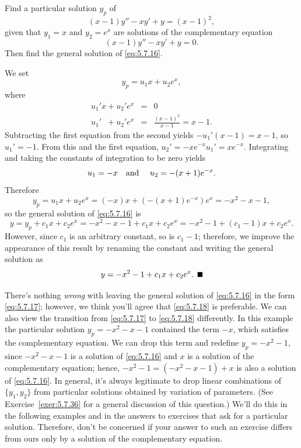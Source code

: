 \begin{example}
  \label{example:5.7.2} \rm Find a particular solution $y_{p}$ of
  \begin{equation}
    \label{eq:5.7.16}(x-1)y''-xy'+y=(x-1)^{2},
  \end{equation}
  given that $y_{1}=x$ and $y_{2}=e^{x}$ are solutions of the complementary equation
  \[
    (x-1)y''-xy'+y=0.
  \]
  Then find the general solution of \eqref{eq:5.7.16}.
\end{example}

\begin{examplesolution}
\solution We set
\[
  y_{p}=u_{1}x+u_{2}e^{x},
\]
where
\begin{eqnarray*}
  u_{1}'x+u_{2}'e^{x}           & = & 0 \\
  u_{1}'\phantom{x}+u_{2}'e^{x} & = & \frac{(x-1)^{2}}{x-1}=x-1.
\end{eqnarray*}
Subtracting the first equation from the second yields $-u_{1}'(x-1)=x-1$, so $u_{1}'=-1$. From this
and the first equation, $u_{2}'=-xe^{-x}u_{1}'=xe^{-x}$. Integrating and taking the constants of
integration to be zero yields
\[
  u_{1}=-x\mbox{\quad and \quad}u_{2}=-(x+1)e^{-x}.
\]
Therefore
\[
  y_{p}=u_{1}x+u_{2}e^{x}=(-x)x+(-(x+1)e^{-x})e^{x}=-x^{2}-x-1,
\]
so the general solution of \eqref{eq:5.7.16} is
\begin{equation}
  \label{eq:5.7.17}y=y_{p}+c_{1}x+c_{2}e^{x}=-x^{2}-x-1+c_{1}x+c_{2}e^{x}=-x^{2}-1+(c_{1}-1)x+c_{2}e^{x}.
\end{equation}
However, since $c_{1}$ is an arbitrary constant, so is $c_{1}-1$; therefore, we improve the
appearance of this result by renaming the constant and writing the general solution as
\begin{equation}
  \label{eq:5.7.18}y=-x^{2}-1+c_{1}x+c_{2}e^{x}.\bbox
\end{equation}
\end{examplesolution}

There's nothing {\color{blue}\it wrong\/} with leaving the general solution of \eqref{eq:5.7.16} in
the form \eqref{eq:5.7.17}; however, we think you'll agree that \eqref{eq:5.7.18} is preferable. We
can also view the transition from \eqref{eq:5.7.17} to \eqref{eq:5.7.18} differently. In this
example the particular solution $y_{p}=-x^{2}-x-1$ contained the term $-x$, which satisfies the
complementary equation. We can drop this term and redefine $y_{p}=-x^{2}-1$, since $-x^{2}-x-1$ is a
solution of \eqref{eq:5.7.16} and $x$ is a solution of the complementary equation; hence,
$-x^{2}-1=(-x^{2}-x-1)+x$ is also a solution of \eqref{eq:5.7.16}. In general, it's always
legitimate to drop linear combinations of $\{y_{1},y_{2}\}$ from particular solutions obtained by
variation of parameters. (See Exercise~\ref{exer:5.7.36} for a general discussion of this question.)
We'll do this in the following examples and in the answers to exercises that ask for a particular
solution. Therefore, don't be concerned if your answer to such an exercise differs from ours only by
a solution of the complementary equation.

